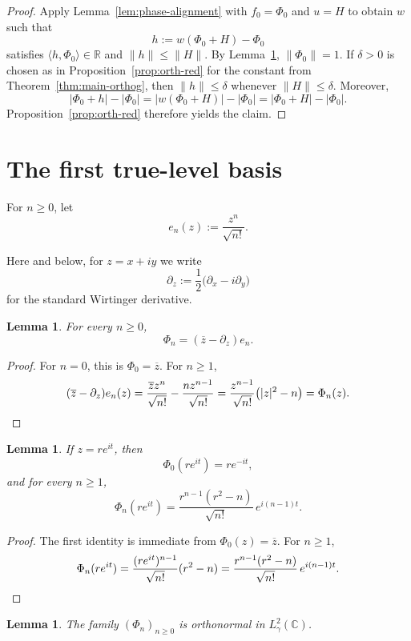 \documentclass[11pt]{amsart}
\newtheorem{lemma}[theorem]{Lemma}
\theoremstyle{remark}
\newcommand{\C}{\mathbb{C}}
\newcommand{\R}{\mathbb{R}}
\newcommand{\abs}[1]{\lvert #1 \rvert}
\newcommand{\norm}[1]{\lVert #1 \rVert}
\newcommand{\ip}[2]{\langle #1,#2\rangle}
\begin{document}
\begin{proof}
Apply Lemma~\ref{lem:phase-alignment} with $f_0=\Phi_0$ and $u=H$ to obtain
$w$ such that
\[
h := w(\Phi_0 + H) - \Phi_0
\]
satisfies $\ip{h}{\Phi_0}\in\R$ and $\norm{h}\le\norm{H}$. By
Lemma~\ref{lem:orthonormal}, $\norm{\Phi_0}=1$. If
$\delta>0$ is chosen as in Proposition~\ref{prop:orth-red} for the constant
from Theorem~\ref{thm:main-orthog}, then $\norm{h}\le\delta$ whenever
$\norm{H}\le\delta$. Moreover,
\[
\abs{\Phi_0 + h} - \abs{\Phi_0}
=
\abs{w(\Phi_0 + H)} - \abs{\Phi_0}
=
\abs{\Phi_0 + H} - \abs{\Phi_0}.
\]
Proposition~\ref{prop:orth-red} therefore yields the claim.
\end{proof}

\section{The first true-level basis}

For $n \ge 0$, let
\[
e_n(z) := \frac{z^n}{\sqrt{n!}}.
\]

Here and below, for $z=x+iy$ we write
\[
\partial_z := \frac12\bigl(\partial_x - i\partial_y\bigr)
\]
for the standard Wirtinger derivative.

\begin{lemma}\label{lem:basis-operator}
For every $n \ge 0$,
\[
\Phi_n = (\overline z - \partial_z)e_n.
\]
\end{lemma}

\begin{proof}
For $n=0$, this is $\Phi_0 = \overline z$. For $n \ge 1$,
\[
(\overline z - \partial_z)e_n(z)
=
\frac{\overline z z^n}{\sqrt{n!}} - \frac{n z^{n-1}}{\sqrt{n!}}
=
\frac{z^{n-1}}{\sqrt{n!}}\bigl(\abs{z}^2 - n\bigr)
=
\Phi_n(z).
\qedhere
\]
\end{proof}

\begin{lemma}\label{lem:polar-basis}
If $z=re^{it}$, then
\[
\Phi_0(re^{it}) = re^{-it},
\]
and for every $n \ge 1$,
\[
\Phi_n(re^{it})
=
\frac{r^{n-1}(r^2 - n)}{\sqrt{n!}}\,e^{i(n-1)t}.
\]
\end{lemma}

\begin{proof}
The first identity is immediate from $\Phi_0(z)=\overline z$. For $n \ge 1$,
\[
\Phi_n(re^{it})
=
\frac{(re^{it})^{n-1}}{\sqrt{n!}}(r^2-n)
=
\frac{r^{n-1}(r^2 - n)}{\sqrt{n!}}\,e^{i(n-1)t}.
\qedhere
\]
\end{proof}

\begin{lemma}\label{lem:orthonormal}
The family $(\Phi_n)_{n\ge0}$ is orthonormal in $L^2_\gamma(\C)$.
\end{lemma}
\end{document}
